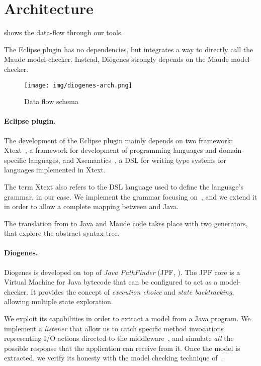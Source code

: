 \section{Architecture}

 shows the data-flow through our tools.

The Eclipse plugin has no dependencies,
but integrates a way to directly call the Maude model-checker.
%
Instead, Diogenes strongly depends on
the Maude model-checker.


\begin{figure}[t]
    \texttt{[image: img/diogenes-arch.png]}
    \caption{Data flow schema}
    \label{fig:data-flow}
\end{figure}

\paragraph{Eclipse plugin.}
The development of the Eclipse plugin mainly depends on
two framework: Xtext~\cite{xtext-site}, a framework for 
development of programming languages and domain-specific languages, and
Xsemantics~\cite{xsemantics-site}, a DSL for writing type systems
for languages implemented in Xtext.

The term Xtext also refers to the DSL language
used to define the language's grammar, \coco in our case.
We implement the grammar focusing on~\cite{verifiable},
and we extend it
in order to allow a complete mapping between \coco and Java.

The translation from \coco to Java and Maude code
takes place with two generators, that explore the abstract syntax tree. 

\paragraph{Diogenes.}
Diogenes is developed on top of \emph{Java PathFinder}
(JPF, \cite{lerda2001addressing,visser2003model}).
The JPF core is a Virtual Machine for Java bytecode
that can be configured to act as a model-checker.
It provides the concept of \emph{execution choice}
and \emph{state backtracking}, allowing multiple state exploration.

We exploit its capabilities in order to extract a \coco model
from a Java program. We implement a \emph{listener} that allow us
to catch specific method invocations representing I/O actions
directed to the middleware~\cite{CO2middleware},
and simulate \emph{all} the possible response that 
the application can receive from it.
Once the \coco model is extracted, we verify its honesty
with the model checking technique of~\cite{verifiable}.


